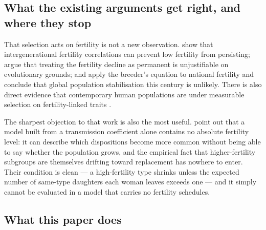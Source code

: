 \subsection{What the existing arguments get right, and where they stop}
\label{sec:prior-work}

That selection acts on fertility is not a new observation. \citet{kolk2014} show
that intergenerational fertility correlations can prevent low fertility from
persisting; \citet{burger2016} argue that treating the fertility decline as
permanent is unjustifiable on evolutionary grounds; and \citet{collins2019} apply
the breeder's equation to national fertility and conclude that global population
stabilisation this century is unlikely. There is also direct evidence that
contemporary human populations are under measurable selection on
fertility-linked traits \citep{byars2010,beauchamp2016,kong2017}.

The sharpest objection to that work is also the most useful.
\citet{arenberg2022} point out that a model built from a transmission
coefficient alone contains no absolute fertility level: it can describe which
dispositions become more common without being able to say whether the population
grows, and the empirical fact that higher-fertility subgroups are themselves
drifting toward replacement has nowhere to enter. Their condition is clean --- a
high-fertility type shrinks unless the expected number of same-type daughters
each woman leaves exceeds one --- and it simply cannot be evaluated in a model
that carries no fertility schedules.

\subsection{What this paper does}
\label{sec:contribution}

